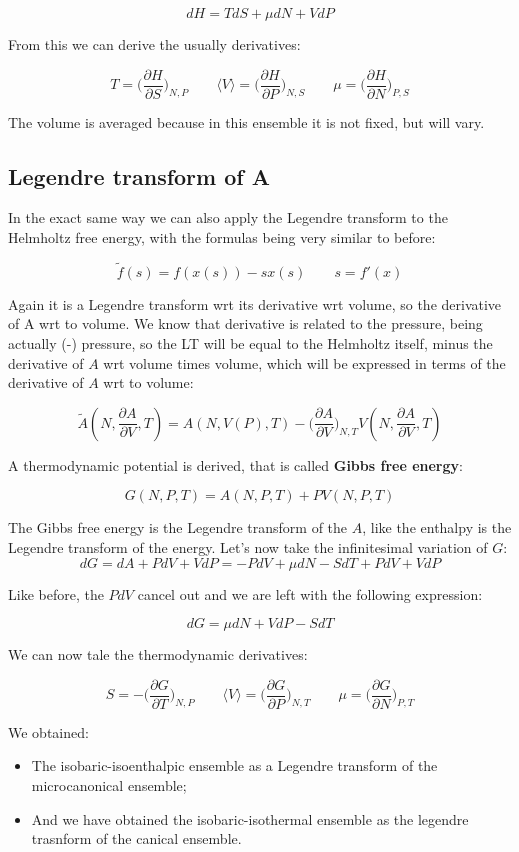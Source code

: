 	$$dH = TdS + \mu dN + VdP$$

From this we can derive the usually derivatives:

	$$T = \biggl(\frac{\partial H}{\partial S}\biggr)_{N, P} \qquad \langle V\rangle = \biggl(\frac{\partial H}{\partial P}\biggr)_{N, S} \qquad \mu = \biggl(\frac{\partial H}{\partial N}\biggr)_{P, S}$$

	The volume is averaged because in this ensemble it is not fixed, but will vary.

	\subsection{Legendre transform of A}
	 In the exact same way we can also apply the Legendre transform to the Helmholtz free energy, with the formulas being very similar to before:

	$$\tilde{f}(s) = f(x(s))-sx(s)\qquad s = f'(x)$$

	Again it is a Legendre transform wrt its derivative wrt volume, so the derivative of A wrt to volume. We know that derivative is related to the pressure, being actually (-) pressure, so the LT will be equal to the Helmholtz itself, minus the derivative of $A$ wrt volume times volume, which will be expressed in terms of the derivative of $A$ wrt to volume:

	$$\tilde{A}(N, \frac{\partial A}{\partial V}, T) = A(N, V(P), T)- \biggl(\frac{\partial A}{\partial V}\biggr)_{N, T}V(N, \frac{\partial A}{\partial V}, T)$$

	A thermodynamic potential is derived, that is called \textbf{Gibbs free energy}:

	$$G(N, P, T) = A(N, P, T) + PV(N, P, T)$$

	The Gibbs free energy is the Legendre transform of the $A$, like the enthalpy is the Legendre transform of the energy.
	Let's now take the infinitesimal variation of $G$:
	$$dG = dA + PdV + VdP = -PdV + \mu dN - SdT + PdV + VdP$$

	Like before, the $PdV$ cancel out and we are left with the following expression:

	$$dG = \mu dN + VdP - SdT$$

	We can now tale the thermodynamic derivatives:

	$$S = -\biggl(\frac{\partial G}{\partial T}\biggr)_{N, P}\qquad\langle V\rangle = \biggl(\frac{\partial G}{\partial P}\biggr)_{N, T}\qquad \mu = \biggl(\frac{\partial G}{\partial N}\biggr)_{P, T}$$

	We obtained:
	\begin{itemize}
	\item The isobaric-isoenthalpic ensemble as a Legendre transform of the microcanonical ensemble;
	\item And we have obtained the isobaric-isothermal ensemble as the legendre trasnform of the canical ensemble.
	\end{itemize}

